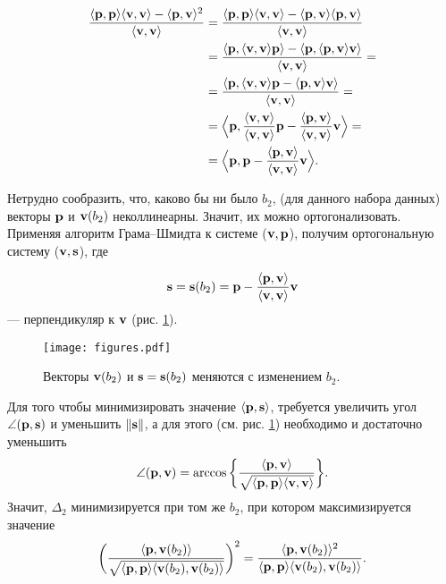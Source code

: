 \[
\begin{split}
\dfrac{\langle \mathbf{p}, \mathbf{p} \rangle\langle \mathbf{v}, \mathbf{v} \rangle - \langle \mathbf{p}, \mathbf{v} \rangle^2}{\langle \mathbf{v}, \mathbf{v} \rangle} & = \dfrac{\langle \mathbf{p}, \mathbf{p} \rangle\langle \mathbf{v}, \mathbf{v} \rangle - \langle \mathbf{p}, \mathbf{v} \rangle \langle \mathbf{p}, \mathbf{v} \rangle}{\langle \mathbf{v}, \mathbf{v} \rangle}\\
& = \dfrac{\langle \mathbf{p}, \langle \mathbf{v}, \mathbf{v} \rangle \mathbf{p} \rangle - \langle \mathbf{p}, \langle \mathbf{p}, \mathbf{v} \rangle \mathbf{v} \rangle}{\langle \mathbf{v}, \mathbf{v} \rangle} =\\
& = \dfrac{\langle \mathbf{p}, \langle \mathbf{v}, \mathbf{v} \rangle \mathbf{p} - \langle \mathbf{p}, \mathbf{v} \rangle \mathbf{v} \rangle}{\langle \mathbf{v}, \mathbf{v} \rangle} =\\
& = \Big \langle \mathbf{p},  \dfrac{\langle \mathbf{v}, \mathbf{v} \rangle}{\langle \mathbf{v}, \mathbf{v} \rangle} \mathbf{p} - \dfrac{\langle \mathbf{p}, \mathbf{v} \rangle}{\langle \mathbf{v}, \mathbf{v} \rangle} \mathbf{v}  \Big \rangle =\\
& = \Big \langle \mathbf{p},  \mathbf{p} - \dfrac{\langle \mathbf{p}, \mathbf{v} \rangle}{\langle \mathbf{v}, \mathbf{v} \rangle} \mathbf{v}  \Big \rangle.
\end{split}
\]

Нетрудно сообразить, что, каково бы ни было $b_2$, (для данного набора данных) векторы $\mathbf{p}$ и $\mathbf{v}(b_2)$ неколлинеарны. Значит, их можно ортогонализовать. Применяя алгоритм Грама--Шмидта к системе ($\mathbf{v}, \mathbf{p}$), получим ортогональную систему ($\mathbf{v}, \mathbf{s}$), где 

\[
\mathbf{s} = \mathbf{s}(b_2) = \mathbf{p} - \dfrac{\langle \mathbf{p}, \mathbf{v} \rangle}{\langle \mathbf{v}, \mathbf{v} \rangle} \mathbf{v}
\]
--- перпендикуляр к $\mathbf{v}$ (рис. \ref{fig:fig-1}).

\begin{figure}[h]
\vspace{5pt}
\centering
\texttt{[image: figures.pdf]}
\caption{Векторы $\mathbf{v}(b_2)$ и $\mathbf{s}=\mathbf{s}(b_2)$ меняются  с изменением $b_2$.}
\label{fig:fig-1}
\vspace{5pt}
\end{figure}

Для того чтобы минимизировать значение $\langle \mathbf{p}, \mathbf{s} \rangle$, требуется увеличить угол $\angle (\mathbf{p}, \mathbf{s})$ и уменьшить $\lVert \mathbf{s}\rVert$, а для этого (см. рис. \ref{fig:fig-1}) необходимо и достаточно уменьшить
\[
\angle (\mathbf{p}, \mathbf{v}) = \arccos \bigg\{ \dfrac{\langle \mathbf{p}, \mathbf{v} \rangle}{ \sqrt{\langle \mathbf{p}, \mathbf{p} \rangle\langle \mathbf{v}, \mathbf{v} \rangle} } \bigg\}.
\]
Значит, $\Delta _2$ минимизируется при том же $b_2$, при котором максимизируется значение
\[
\bigg( \dfrac{\langle \mathbf{p}, \mathbf{v}(b_2) \rangle}{ \sqrt{\langle \mathbf{p}, \mathbf{p} \rangle\langle \mathbf{v}(b_2), \mathbf{v}(b_2) \rangle} } \bigg)^2 =  \dfrac{\langle \mathbf{p}, \mathbf{v}(b_2) \rangle^2}{ \langle \mathbf{p}, \mathbf{p} \rangle\langle \mathbf{v}(b_2), \mathbf{v}(b_2) \rangle }.
\]

